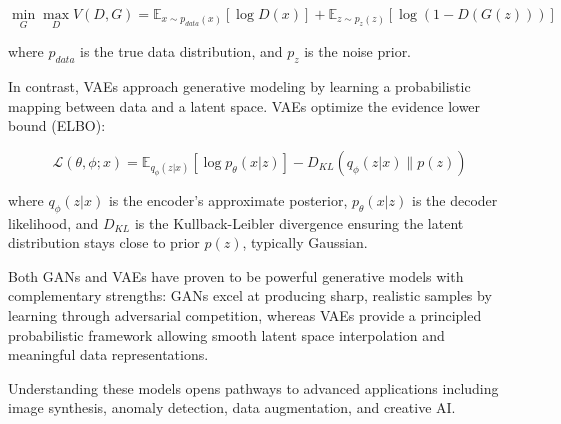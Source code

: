 \documentclass{book}
\begin{document}
\[
\min_G \max_D V(D, G) = \mathbb{E}_{x \sim p_{data}(x)}[\log D(x)] + \mathbb{E}_{z \sim p_z(z)}[\log(1 - D(G(z)))]
\]

where \(p_{data}\) is the true data distribution, and \(p_z\) is the noise prior.

\vspace{0.5cm}
In contrast, VAEs approach generative modeling by learning a probabilistic mapping between data and a latent space. VAEs optimize the evidence lower bound (ELBO):

\[
\mathcal{L}(\theta, \phi; x) = \mathbb{E}_{q_\phi(z|x)}[\log p_\theta(x|z)] - D_{KL}(q_\phi(z|x) \| p(z))
\]

where \(q_\phi(z|x)\) is the encoder’s approximate posterior, \(p_\theta(x|z)\) is the decoder likelihood, and \(D_{KL}\) is the Kullback-Leibler divergence ensuring the latent distribution stays close to prior \(p(z)\), typically Gaussian.

\vspace{0.5cm}
\begin{center}
\end{center}

\vspace{0.5cm}
Both GANs and VAEs have proven to be powerful generative models with complementary strengths: GANs excel at producing sharp, realistic samples by learning through adversarial competition, whereas VAEs provide a principled probabilistic framework allowing smooth latent space interpolation and meaningful data representations.

\vspace{0.3cm}
Understanding these models opens pathways to advanced applications including image synthesis, anomaly detection, data augmentation, and creative AI.
\end{document}
